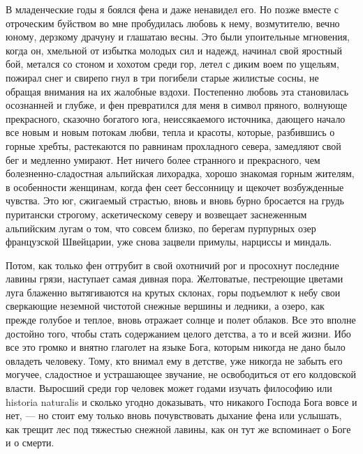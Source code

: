 В  младенческие годы  я боялся  фена и  даже ненавидел  его. Но  позже
вместе  с  отроческим  буйством  во мне  пробудилась  любовь  к  нему,
возмутителю, вечно юному, дерзкому драчуну  и глашатаю весны. Это были
упоительные мгновения,  когда он,  хмельной от  избытка молодых  сил и
надежд, начинал свой  яростный бой, метался со стоном  и хохотом среди
гор, летел с диким воем по ущельям,  пожирал снег и свирепо гнул в три
погибели старые  жилистые сосны,  не обращая  внимания на  их жалобные
вздохи. Постепенно любовь  эта становилась осознанней и  глубже, и фен
превратился для меня в  символ пряного, волнующе прекрасного, сказочно
богатого  юга, неиссякаемого  источника,  дающего начало  все новым  и
новым потокам  любви, тепла  и красоты,  которые, разбившись  о горные
хребты, растекаются по равнинам прохладного севера, замедляют свой бег
и  медленно умирают.  Нет ничего  более странного  и прекрасного,  чем
болезненно-сладостная  альпийская  лихорадка, хорошо  знакомая  горным
жителям, в особенности  женщинам, когда фен сеет  бессонницу и щекочет
возбужденные  чувства.  Это  юг,  сжигаемый страстью,  вновь  и  вновь
бурно бросается  на грудь пуритански строгому,  аскетическому северу и
возвещает заснеженным  альпийским лугам о  том, что совсем  близко, по
берегам  пурпурных  озер  французской  Швейцарии,  уже  снова  зацвели
примулы, нарциссы и миндаль.

Потом,  как только  фен  оттрубит  в свой  охотничий  рог и  просохнут
последние  лавины  грязи,  наступает самая  дивная  пора.  Желтоватые,
пестреющие цветами луга блаженно  вытягиваются на крутых склонах, горы
подъемлют к небу  свои сверкающие неземной чистотой  снежные вершины и
ледники, а озеро, как прежде голубое и теплое, вновь отражает солнце и
полет облаков. Все  это вполне достойно того,  чтобы стать содержанием
целого  детства, а  то  и всей  жизни.  Ибо все  это  громко и  внятно
глаголет  на  языке  Бога,  которым  никогда  не  дано  было  овладеть
человеку. Тому,  кто внимал ему в  детстве, уже никогда не  забыть его
могучее,  сладостное и  устрашающее звучание,  не освободиться  от его
колдовской  власти. Выросший  среди гор  человек может  годами изучать
философию  или historia  naturalis  и сколько  угодно доказывать,  что
никакого  Господа Бога  вовсе и  нет, ---  но стоит  ему только  вновь
почувствовать дыхание фена  или услышать, как трещит  лес под тяжестью
снежной лавины, как он тут же вспоминает о Боге и о смерти.

